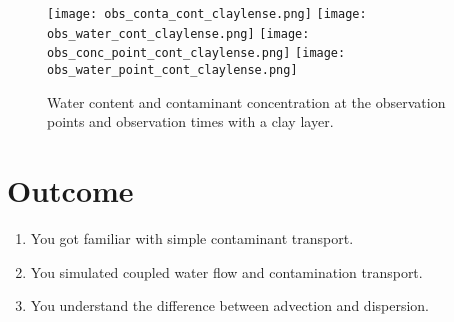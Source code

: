 \documentclass[
10pt, %
a4paper, %
oneside, %
headinclude,footinclude, %
BCOR5mm, %
]{scrartcl}
\begin{document}
\begin{figure}[!h]
	\centering
	\texttt{[image: obs\_conta\_cont\_claylense.png]}
	\texttt{[image: obs\_water\_cont\_claylense.png]}
	\texttt{[image: obs\_conc\_point\_cont\_claylense.png]}
	\texttt{[image: obs\_water\_point\_cont\_claylense.png]}
	\caption{Water content  and contaminant concentration at the observation points and observation times with a clay layer.}
\end{figure}


\newpage
\newpage
\newpage
\newpage
\pagebreak
\section{Outcome}
\begin{enumerate}
\item You got familiar with simple contaminant transport.
\item You simulated coupled water flow and contamination transport.
\item You understand the difference between advection and dispersion.
\end{enumerate}





%


\end{document}
